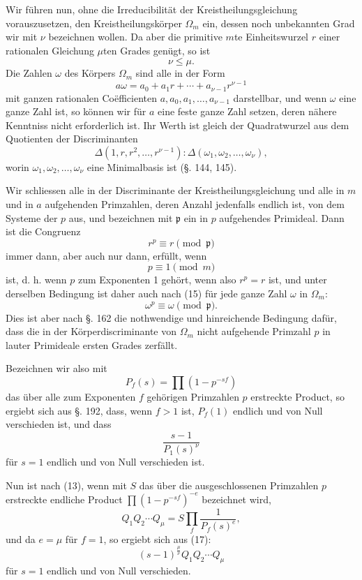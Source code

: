 \documentclass[11pt]{article}
\begin{document}
Wir führen nun, ohne die Irreducibilität der Kreistheilungsgleichung vorauszusetzen, den Kreistheilungskörper $\Omega_m$ ein, dessen noch unbekannten Grad wir mit $\nu$ bezeichnen wollen. Da aber die primitive $m$te Einheitswurzel $r$ einer rationalen Gleichung $\mu$ten Grades genügt, so ist
\begin{equation}\tag{14}
\nu\leq\mu.
\end{equation}
Die Zahlen $\omega$ des Körpers $\Omega_m$ sind alle in der Form
\begin{equation}\tag{15}
a\omega=a_0+a_1r+\cdots+a_{\nu-1}r^{\nu-1}
\end{equation}
mit ganzen rationalen Coëfficienten $a,a_0,a_1,\ldots,a_{\nu-1}$ darstellbar,
und wenn $\omega$ eine ganze Zahl ist, so können wir für $a$ eine feste ganze Zahl setzen, deren nähere Kenntniss nicht erforderlich ist. Ihr Werth ist gleich der Quadratwurzel aus dem Quotienten der Discriminanten
\[
\Delta(1,r,r^2,\ldots,r^{\nu-1}):\Delta(\omega_1,\omega_2,\ldots,\omega_\nu),
\]
worin $\omega_1,\omega_2,\ldots,\omega_\nu$ eine Minimalbasis ist (§. 144, 145).

Wir schliessen alle in der Discriminante der Kreistheilungsgleichung und alle in $m$ und in $a$ aufgehenden Primzahlen, deren Anzahl jedenfalls endlich ist, von dem Systeme der $p$ aus, und bezeichnen mit $\mathfrak p$ ein in $p$ aufgehendes Primideal. Dann ist die Congruenz
\[
r^p\equiv r \pmod{\mathfrak p}
\]
immer dann, aber auch nur dann, erfüllt, wenn
\begin{equation}\tag{16}
p\equiv1 \pmod m
\end{equation}
ist, d. h. wenn $p$ zum Exponenten 1 gehört, wenn also $r^p=r$ ist, und unter derselben Bedingung ist daher auch nach (15) für jede ganze Zahl $\omega$ in $\Omega_m$:
\[
\omega^p\equiv\omega \pmod{\mathfrak p}.
\]
Dies ist aber nach §. 162 die nothwendige und hinreichende Bedingung dafür, dass die in der Körperdiscriminante von $\Omega_m$ nicht aufgehende Primzahl $p$ in lauter Primideale ersten Grades zerfällt.

Bezeichnen wir also mit
\[
P_f(s)=\prod (1-p^{-sf})
\]
das über alle zum Exponenten $f$ gehörigen Primzahlen $p$ erstreckte Product, so ergiebt sich aus §. 192, dass, wenn $f>1$ ist, $P_f(1)$ endlich und von Null verschieden ist, und dass
\begin{equation}\tag{17}
\frac{s-1}{P_1(s)^\nu}
\end{equation}
für $s=1$ endlich und von Null verschieden ist.

Nun ist nach (13), wenn mit $S$ das über die ausgeschlossenen Primzahlen $p$ erstreckte endliche Product $\prod(1-p^{-sf})^{-e}$ bezeichnet wird,
\[
Q_1Q_2\cdots Q_\mu=S\prod_f\frac{1}{P_f(s)^e},
\]
und da $e=\mu$ für $f=1$, so ergiebt sich aus (17):
\begin{equation}\tag{18}
(s-1)^{\frac{\mu}{\nu}}Q_1Q_2\cdots Q_\mu
\end{equation}
für $s=1$ endlich und von Null verschieden.
\end{document}
